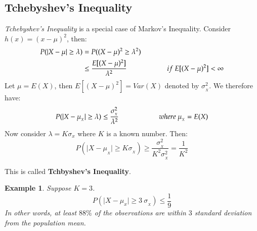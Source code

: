 \documentclass[14pt,twoside,a4paper,fleqn]{article}
\theoremstyle{plain}
\newtheorem{example}{Example}[section]
\begin{document}
\subsection{Tchebyshev's Inequality}
\emph{Tchebyshev's Inequality} is a special case of Markov's Inequality. \mbox{Consider $h(x) = (x-\mu)^2$}, then:
	\begin{equation*}
	\begin{split}
	P(\vert X-\mu \vert \geq \lambda) &= P((X-\mu)^2 \geq \lambda^2)\\
		&\leq \frac{E[(X-\mu)^2]}{\lambda^2}\tab[2cm]if\ E[(X-\mu)^2]<\infty
	\end{split}
	\end{equation*}
Let $\mu = E(X)$, then $E[(X-\mu)^2] = Var(X)$ denoted by $\sigma_{_X}^2$. We therefore have:
	\begin{equation}\label{tchev_sigma}
		P(\vert X-\mu_{_X} \vert \geq \lambda) \leq \frac{\sigma_{_X}^2}{\lambda^2}\tab[2cm] where\ \mu_{_X} = E(X)
	\end{equation}
Now consider $\lambda= K\sigma_x$ where $K$ is a known number. Then:
	\begin{equation}\label{tchev}
		P(\vert X-\mu_{_X}\vert \geq K\sigma_{_X}) \geq \frac{\sigma_{_X}^2}{K^2\sigma_{_X}^2}=\frac{1}{K^2}
	\end{equation}

This is called \textbf{Tchbyshev's Inequality}. 
\begin{example}
Suppose $K=3$.\hfill\newline
$$P(\vert X-\mu_x\vert \geq 3\ \sigma_{_X}) \leq \frac{1}{9}$$
In other words, at least $88\%$ of the observations are within $3$ standard deviation from the population mean.
\end{example}
\end{document}
